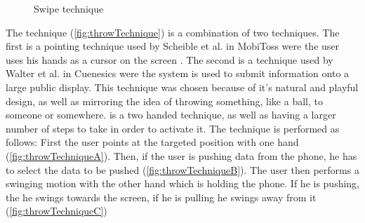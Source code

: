\begin{figure}[H]
	\caption{Swipe technique}
	\label{fig:swipeTechnique}
\end{figure}

The \throw technique (\cref{fig:throwTechnique}) is a combination of two techniques.
The first is a pointing technique used by Scheible et al. in MobiToss \cite{Scheible:2008} were the user uses his hands as a cursor on the screen .
The second is a technique used by Walter et al. in Cuenesics \cite{Walter:2014} were the system is used to submit information onto a large public display.
This technique was chosen because of it's natural and playful design, as well as mirroring the idea of throwing something, like a ball, to someone or somewhere.
\throw is a two handed technique, as well as having a larger number of steps to take in order to activate it.
The \throw technique is performed as follows: 
First the user points at the targeted position with one hand (\cref{fig:throwTechniqueA}).
Then, if the user is pushing data from the phone, he has to select the data to be pushed (\cref{fig:throwTechniqueB}).
The user then performs a swinging motion with the other hand which is holding the phone.
If he is pushing, the he swings towards the screen, if he is pulling he swings away from it (\cref{fig:throwTechniqueC}) 


